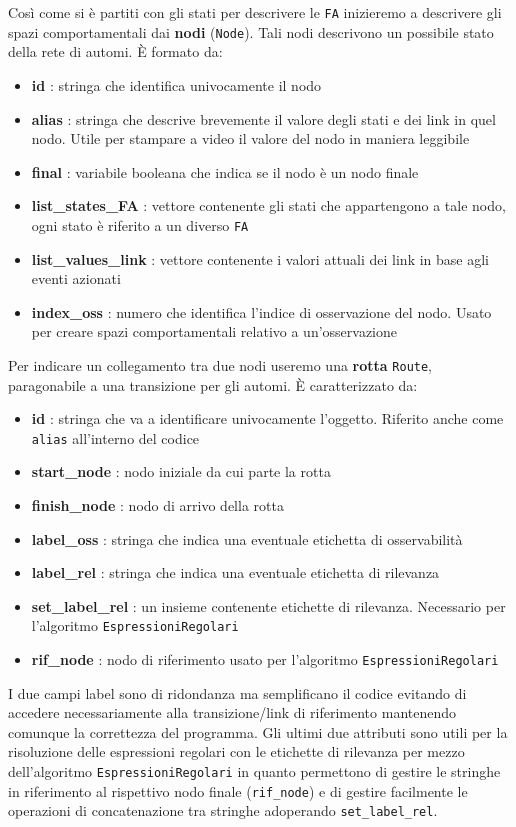 Così come si è partiti con gli stati per descrivere le \texttt{FA} inizieremo a descrivere gli spazi comportamentali dai \textbf{nodi} (\texttt{Node}). Tali nodi descrivono un possibile stato della rete di automi. È formato da:
\begin{itemize}
    \item \textbf{id} : stringa che identifica univocamente il nodo
    \item \textbf{alias} : stringa che descrive brevemente il valore degli stati e dei link in quel nodo. Utile per stampare a video il valore del nodo in maniera leggibile
    \item \textbf{final} : variabile booleana che  indica se il nodo è un nodo finale
    \item \textbf{list\_states\_FA} : vettore contenente gli stati che appartengono a tale nodo, ogni stato è riferito a un diverso \texttt{FA}
    \item \textbf{list\_values\_link} : vettore contenente i valori attuali dei link in base agli eventi azionati
    \item \textbf{index\_oss} : numero che identifica l'indice di osservazione del nodo. Usato per creare spazi comportamentali relativo a un'osservazione
\end{itemize}
Per indicare un collegamento tra due nodi useremo una \textbf{rotta} \texttt{Route}, paragonabile a una transizione per gli automi. È caratterizzato da:
\begin{itemize}
    \item \textbf{id} : stringa che va a identificare univocamente l'oggetto. Riferito anche come \texttt{alias} all'interno del codice 
    \item \textbf{start\_node} : nodo iniziale da cui parte la rotta
    \item \textbf{finish\_node} : nodo di arrivo della rotta
    \item \textbf{label\_oss} : stringa che indica una eventuale etichetta di osservabilità
    \item \textbf{label\_rel} : stringa che indica una eventuale etichetta di rilevanza
    \item \textbf{set\_label\_rel} :  un insieme contenente etichette di rilevanza. Necessario per l'algoritmo \texttt{EspressioniRegolari}
    \item \textbf{rif\_node} : nodo di riferimento usato per l'algoritmo \texttt{EspressioniRegolari}
\end{itemize}
I due campi label sono di ridondanza ma semplificano il codice evitando di accedere necessariamente alla transizione/link di riferimento mantenendo comunque la correttezza del programma.
Gli ultimi due attributi sono utili per la risoluzione delle espressioni regolari con le etichette di rilevanza per mezzo dell'algoritmo \texttt{EspressioniRegolari} in quanto permettono di gestire le stringhe in riferimento al rispettivo nodo finale (\texttt{rif\_node}) e di gestire facilmente le operazioni di concatenazione tra stringhe adoperando \texttt{set\_label\_rel}. \newline

